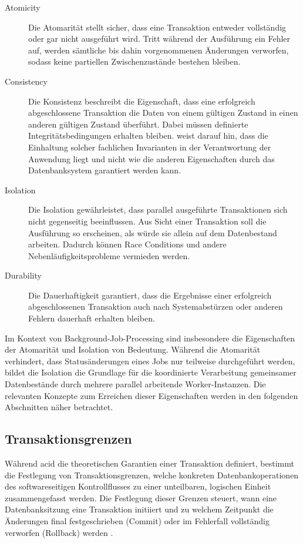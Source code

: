 \begin{description}
    \item[Atomicity]
    Die Atomarität stellt sicher, dass eine Transaktion entweder vollständig oder gar nicht ausgeführt wird.
    Tritt während der Ausführung ein Fehler auf, werden sämtliche bis dahin vorgenommenen Änderungen verworfen, sodass keine
    partiellen Zwischenzustände bestehen bleiben.

    \item[Consistency]
    Die Konsistenz beschreibt die Eigenschaft, dass eine erfolgreich abgeschlossene Transaktion die Daten von einem gültigen Zustand
    in einen anderen gültigen Zustand überführt.
    Dabei müssen definierte Integritätsbedingungen erhalten bleiben.
    \textcite[Kap.~7 Abschnitt \glqq Consistency\grqq]{kleppmann_designing_2017} weist darauf hin, dass die Einhaltung solcher fachlichen
    Invarianten in der Verantwortung der Anwendung liegt und nicht wie die anderen Eigenschaften durch das Datenbanksystem garantiert werden kann.

    \item[Isolation]
    Die Isolation gewährleistet, dass parallel ausgeführte Transaktionen sich nicht gegenseitig beeinflussen.
    Aus Sicht einer Transaktion soll die Ausführung so erscheinen, als würde sie allein auf dem Datenbestand arbeiten.
    Dadurch können Race Conditions und andere Nebenläufigkeitsprobleme vermieden werden.

    \item[Durability]
    Die Dauerhaftigkeit garantiert, dass die Ergebnisse einer erfolgreich abgeschlossenen Transaktion auch nach Systemabstürzen
    oder anderen Fehlern dauerhaft erhalten bleiben.
\end{description}
Im Kontext von Background-Job-Processing sind insbesondere die Eigenschaften der Atomarität und Isolation von Bedeutung.
Während die Atomarität verhindert, dass Statusänderungen eines Jobs nur teilweise durchgeführt werden, bildet die Isolation
die Grundlage für die koordinierte Verarbeitung gemeinsamer Datenbestände durch mehrere parallel arbeitende Worker-Instanzen.
Die relevanten Konzepte zum Erreichen dieser Eigenschaften werden in den folgenden Abschnitten näher betrachtet.

\subsection{Transaktionsgrenzen}
\label{subsec:transaktionsgrenzen}
Während \gls{acid} die theoretischen Garantien einer Transaktion definiert, bestimmt die Festlegung von Transaktionsgrenzen,
welche konkreten Datenbankoperationen des softwareseitigen Kontrollflusses zu einer unteilbaren, logischen Einheit zusammengefasst werden.
Die Festlegung dieser Grenzen steuert, wann eine Datenbanksitzung eine Transaktion initiiert und zu welchem Zeitpunkt die Änderungen
final festgeschrieben (Commit) oder im Fehlerfall vollständig verworfen (Rollback) werden \parencite[S.250]{kudras_taschenbuch_2015}.

